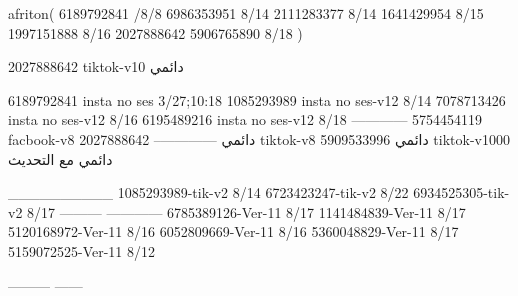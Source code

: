 afriton(
6189792841 /8/8
6986353951 8/14
2111283377 8/14
1641429954 8/15
1997151888 8/16
2027888642
5906765890 8/18
)

2027888642 tiktok-v10
دائمي

6189792841 insta no ses
3/27;10:18
1085293989 insta no ses-v12
8/14
7078713426 insta no ses-v12
8/16
6195489216 insta no ses-v12
8/18
------------
5754454119 facbook-v8
دائمي
--------------
2027888642 tiktok-v8
دائمي
5909533996 tiktok-v1000
دائمي مع التحديث

__________
1085293989-tik-v2
8/14
6723423247-tik-v2
8/22
6934525305-tik-v2
8/17
---------
------------
6785389126-Ver-11
8/17
1141484839-Ver-11
8/17
5120168972-Ver-11
8/16
6052809669-Ver-11
8/16
5360048829-Ver-11
8/17
5159072525-Ver-11
8/12

---------
------
